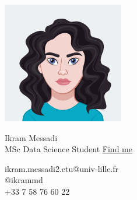 \documentclass{article}
\begin{document}
\centering \includegraphics[width=.25\linewidth]{ikram-logo}\\[5pt]
\parbox{2in}{\Large \centering Ikram Messadi \\[1pt]
    \normalsize MSc Data Science Student
    \href{https://ikram-md.github.io/}{Find me}
}

\vfill
\raggedright
\begin{multicols}{2}

    ikram.messadi2.etu@univ-lille.fr\\ \columnbreak \raggedleft @ikrammd\\ +33 7 58
    76 60 22%
\end{multicols}%
\end{document}
